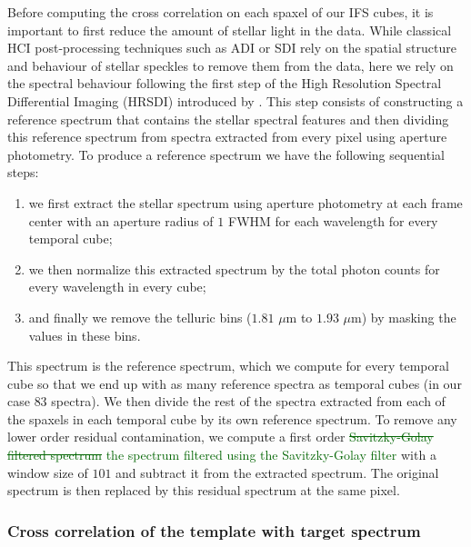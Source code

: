 \documentclass{aa}
\newcommand{\newchange}[1]{\textcolor{darkgreen}{#1}}
\begin{document}
Before computing the cross correlation on each spaxel of our IFS cubes, it is important to first reduce the amount of stellar light in the data. 
While classical HCI post-processing techniques such as ADI or SDI rely on the spatial structure and behaviour of stellar speckles to remove them from the data, here we rely on the spectral behaviour following the first step of the High Resolution Spectral Differential Imaging (HRSDI) introduced by \citet{2019Haffert}. 
This step consists of constructing a reference spectrum that contains the stellar spectral features and then dividing \citep[or subtracting, in the case of][]{2019Haffert} this reference spectrum from spectra extracted from every pixel using aperture photometry. 
To produce a reference spectrum we have the following sequential steps:
\begin{enumerate}
    \item we first extract the stellar spectrum using aperture photometry at each frame center with an aperture radius of $1$ FWHM for each wavelength for every temporal cube;
    \item we then normalize this extracted spectrum by the total photon counts for every wavelength in every cube;
    \item and finally we remove the telluric bins ($1.81$ $\mu$m to $1.93$ $\mu$m) by masking the values in these bins.
\end{enumerate}
This spectrum is the reference spectrum, which we compute for every temporal cube so that we end up with as many reference spectra as temporal cubes (in our case $83$ spectra).
We then divide the rest of the spectra extracted from each of the spaxels in each temporal cube by its own reference spectrum.
To remove any lower order residual contamination, we compute a first order \newchange{\sout{Savitzky-Golay filtered spectrum } the spectrum filtered using the Savitzky-Golay filter \citep{1964SavitzkyGolay}} with a window size of $101$ and subtract it from the extracted spectrum. The original spectrum is then replaced by this residual spectrum at the same pixel.

\subsubsection{Cross correlation of the template with target spectrum}\label{sec: CC algorithm}
\end{document}
